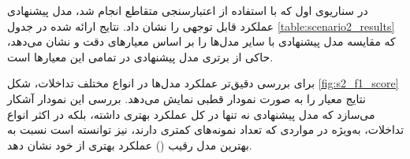 در سناریوی اول که با استفاده از اعتبارسنجی متقاطع  انجام شد، مدل پیشنهادی عملکرد قابل توجهی را نشان داد. نتایج ارائه شده در جدول \ref{table:scenario2_results} که مقایسه مدل پیشنهادی با سایر مدل‌ها را بر اساس معیارهای دقت و  نشان می‌دهد، حاکی از برتری مدل پیشنهادی در تمامی این معیارها است.

برای بررسی دقیق‌تر عملکرد مدل‌ها در انواع مختلف تداخلات، شکل \ref{fig:s2_f1_score} نتایج معیار  را به صورت نمودار قطبی نمایش می‌دهد. بررسی این نمودار آشکار می‌سازد که مدل پیشنهادی نه تنها در کل عملکرد بهتری داشته، بلکه در اکثر انواع تداخلات، به‌ویژه در مواردی که تعداد نمونه‌های کمتری دارند، نیز توانسته است نسبت به بهترین مدل رقیب () عملکرد بهتری از خود نشان دهد.

\begin{table}[!t]
	\caption{مقایسه نتایج مدل پیشنهادی با سایر مدل‌ها در سناریوی اول}
	\label{table:scenario2_results}
	\centering %
	\renewcommand{\arraystretch}{2.5} 
\end{table}


